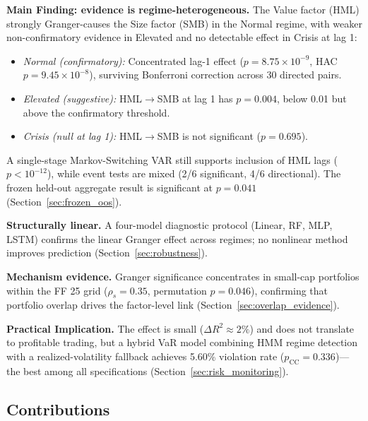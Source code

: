 \documentclass{uai2026}
\begin{document}
\textbf{Main Finding: evidence is regime-heterogeneous.}
The Value factor (HML) strongly Granger-causes the Size factor (SMB) in the
Normal regime, with weaker non-confirmatory evidence in Elevated and no
detectable effect in Crisis at lag 1:
\begin{itemize}
    \item \emph{Normal (confirmatory):} Concentrated lag-1 effect
    ($p = 8.75 \times 10^{-9}$, HAC $p = 9.45 \times 10^{-8}$), surviving
    Bonferroni correction across 30 directed pairs.
    \item \emph{Elevated (suggestive):} HML$\to$SMB at lag 1 has
    $p = 0.004$, below 0.01 but above the confirmatory threshold.
    \item \emph{Crisis (null at lag 1):} HML$\to$SMB is not significant
    ($p = 0.695$).
\end{itemize}
A single-stage Markov-Switching VAR still supports inclusion of HML lags
($p < 10^{-12}$), while event tests are mixed (2/6 significant, 4/6 directional).
The frozen held-out aggregate result is significant at $p = 0.041$
(Section~\ref{sec:frozen_oos}).

\textbf{Structurally linear.} A four-model diagnostic protocol (Linear, RF,
MLP, LSTM) confirms the linear Granger effect across regimes; no nonlinear
method improves prediction (Section~\ref{sec:robustness}).

\textbf{Mechanism evidence.} Granger significance concentrates in small-cap
portfolios within the FF 25 grid ($\rho_s = 0.35$, permutation $p = 0.046$),
confirming that portfolio overlap drives the factor-level link
(Section~\ref{sec:overlap_evidence}).

\textbf{Practical Implication.} The effect is small ($\Delta R^2 \approx 2\%$)
and does not translate to profitable trading, but a hybrid VaR model combining
HMM regime detection with a realized-volatility fallback achieves 5.60\%
violation rate ($p_{\text{CC}} = 0.336$)---the best among all specifications
(Section~\ref{sec:risk_monitoring}).

\subsection{Contributions}
\end{document}
